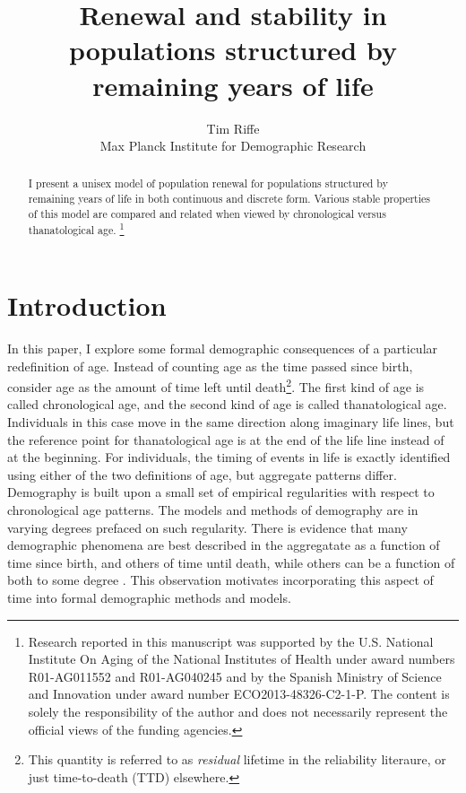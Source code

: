 \documentclass{article}
\newcommand\ackn[1]{%
  \begingroup
  \renewcommand\thefootnote{}\footnote{#1}%
  \addtocounter{footnote}{-1}%
  \endgroup
}
\begin{document}
\title{Renewal and stability in populations structured by remaining
years of life}
\author{Tim Riffe \\ Max Planck Institute for Demographic Research}
\maketitle

\begin{abstract}
I present a unisex model of population renewal for populations structured by
remaining years of life in both continuous and discrete form.
Various stable properties of this model are compared and related when viewed
by chronological versus thanatological age.\ackn{Research reported in this manuscript
was supported by the U.S.
National Institute On Aging of the National Institutes of Health under award numbers R01-AG011552 and R01-AG040245 and by the Spanish Ministry of Science and Innovation under award
number ECO2013-48326-C2-1-P. The content is solely the responsibility of the
author and does not necessarily represent the official views of the funding
agencies.}
\end{abstract}



\onehalfspacing
\section*{Introduction}
In this paper, I explore some formal demographic consequences of a particular redefinition of age. Instead of counting age as the time passed since birth, consider age as the amount of time left until death\footnote{This quantity is referred to as \textit{residual} lifetime
in the reliability literaure, or just time-to-death (TTD) elsewhere.}. The first
kind of age is called chronological age, and the second kind of age is called
thanatological age. Individuals in this case move in the same direction along
imaginary life lines, but the reference point for thanatological age is at
the end of the life line instead of at the beginning. For individuals, the timing of events in life is exactly identified using either of the two definitions of age, but
aggregate patterns differ. Demography is built upon a small set of empirical
regularities with respect to chronological age patterns. The models and methods
of demography are in varying degrees prefaced on such regularity. There is evidence that many demographic phenomena are best described in the
aggregatate as a function of time since birth, and others of time until death,
while others can be a function of both to some degree
\citep{riffe2015ttd,wolf2015disability}. This observation motivates
incorporating this aspect of time into formal demographic methods and models.
\end{document}
